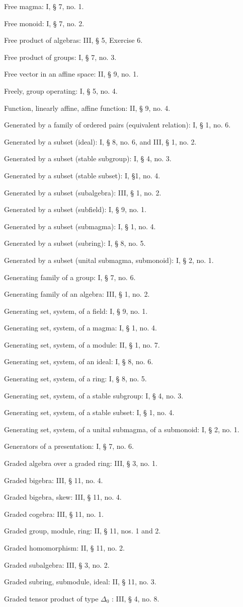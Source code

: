 Free magma: I, § 7, no. 1.

Free monoid: I, § 7, no. 2.

Free product of algebras: III, § 5, Exercise 6.

Free product of groups: I, § 7, no. 3.

Free vector in an affine space: II, § 9, no. 1.

Freely, group operating: I, § 5, no. 4.

Function, linearly affine, affine function: II, § 9, no. 4.

Generated by a family of ordered pairs (equivalent relation): I, § 1, no. 6.

Generated by a subset (ideal): I, § 8, no. 6, and III, § 1, no. 2.

Generated by a subset (stable subgroup): I, § 4, no. 3.

Generated by a subset (stable subset): I, §1, no. 4.

Generated by a subset (subalgebra): III, § 1, no. 2.

Generated by a subset (subfield): I, § 9, no. 1.

Generated by a subset (submagma): I, § 1, no. 4.

Generated by a subset (subring): I, § 8, no. 5.

Generated by a subset (unital submagma, submonoid): I, § 2, no. 1.

Generating family of a group: I, § 7, no. 6.

Generating family of an algebra: III, § 1, no. 2.

Generating set, system, of a field: I, § 9, no. 1.

Generating set, system, of a magma: I, § 1, no. 4.

Generating set, system, of a module: II, § 1, no. 7.

Generating set, system, of an ideal: I, § 8, no. 6.

Generating set, system, of a ring: I, § 8, no. 5.

Generating set, system, of a stable subgroup: I, § 4, no. 3.

Generating set, system, of a stable subset: I, § 1, no. 4.

Generating set, system, of a unital submagma, of a submonoid: I, § 2, no. 1.

Generators of a presentation: I, § 7, no. 6.

Graded algebra over a graded ring: III, § 3, no. 1.

Graded bigebra: III, § 11, no. 4.

Graded bigebra, skew: III, § 11, no. 4.

Graded cogebra: III, § 11, no. 1.

Graded group, module, ring: II, § 11, nos. 1 and 2.

Graded homomorphism: II, § 11, no. 2.

Graded subalgebra: III, § 3, no. 2.

Graded subring, submodule, ideal: II, § 11, no. 3.

Graded tensor product of type \(\Delta_0\) : III, § 4, no. 8.
